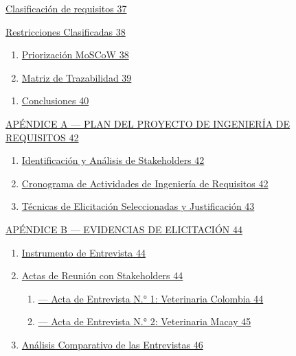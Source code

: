 \documentclass[
]{article}
\begin{document}
\hyperref[clasificaciuxf3n-de-requisitos]{Clasificación de requisitos
37}

\hyperref[_bookmark103]{Restricciones Clasificadas 38}

\begin{enumerate}
\def\labelenumi{\arabic{enumi}.}
\setcounter{enumi}{1}
\item
  \hyperref[priorizaciuxf3n-moscow]{Priorización MoSCoW 38}
\item
  \hyperref[matriz-de-trazabilidad]{Matriz de Trazabilidad 39}
\end{enumerate}

\begin{enumerate}
\def\labelenumi{\arabic{enumi}.}
\setcounter{enumi}{5}
\item
  \hyperref[conclusiones]{Conclusiones 40}
\end{enumerate}

\hyperref[apuxe9ndice-a-plan-del-proyecto-de-ingenieruxeda-de-requisitos]{APÉNDICE
A --- PLAN DEL PROYECTO DE INGENIERÍA DE REQUISITOS 42}

\begin{enumerate}
\def\labelenumi{\arabic{enumi}.}
\item
  \hyperref[identificaciuxf3n-y-anuxe1lisis-de-stakeholders]{Identificación
  y Análisis de Stakeholders 42}
\item
  \hyperref[cronograma-de-actividades-de-ingenieruxeda-de-requisitos]{Cronograma
  de Actividades de Ingeniería de Requisitos 42}
\item
  \hyperref[tuxe9cnicas-de-elicitaciuxf3n-seleccionadas-y-justificaciuxf3n]{Técnicas
  de Elicitación Seleccionadas y Justificación 43}
\end{enumerate}

\hyperref[apuxe9ndice-b-evidencias-de-elicitaciuxf3n]{APÉNDICE B ---
EVIDENCIAS DE ELICITACIÓN 44}

\begin{enumerate}
\def\labelenumi{\arabic{enumi}.}
\item
  \hyperref[instrumento-de-entrevista]{Instrumento de Entrevista 44}
\item
  \hyperref[_bookmark77]{Actas de Reunión con Stakeholders 44}

  \begin{enumerate}
  \def\labelenumii{\arabic{enumii}.}
  \item
    \hyperref[_bookmark78]{--- Acta de Entrevista N.° 1: Veterinaria
    Colombia 44}
  \item
    \hyperref[_bookmark80]{--- Acta de Entrevista N.° 2: Veterinaria
    Macay 45}
  \end{enumerate}
\item
  \hyperref[anuxe1lisis-comparativo-de-las-entrevistas]{Análisis
  Comparativo de las Entrevistas 46}
\end{enumerate}
\end{document}
